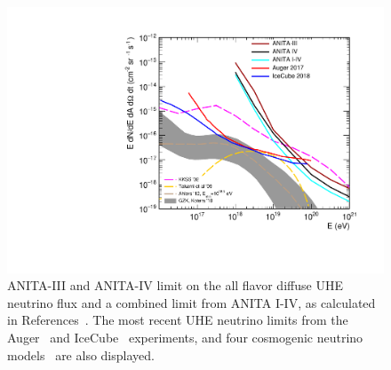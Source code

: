 \begin{figure}[!h]\centering
 \includegraphics[width=.65\linewidth]{./Figs/Limit4icemcPaper.pdf}
 \caption{
 ANITA-III and ANITA-IV limit on the all flavor diffuse UHE neutrino flux and a combined limit from ANITA I-IV, as calculated in References~\cite{anita3cosmogenic,anita4cosmogenic}.
 The most recent UHE neutrino limits
from the Auger~\cite{auger2017} and IceCube~\cite{icecube2018} experiments, and
four cosmogenic neutrino models~\cite{kkss2002,takami2009,ahlers2012,kotera2010cosmogenic} are also displayed. 
}
 \label{fig:sensitivity}
\end{figure}

%
%

